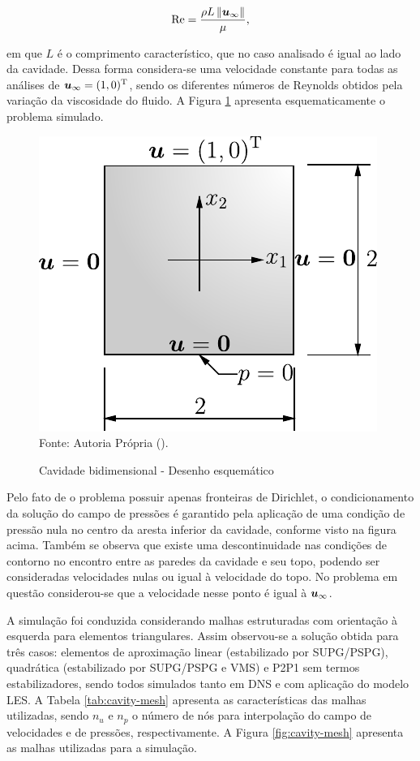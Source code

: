 \begin{equation}
    \mathrm{Re}=\frac{\rho L\left\lVert{\boldsymbol{u}_\infty}\right\lVert}{\mu}\text{,}
    \label{eq:Reynolds}
\end{equation}

\noindent em que $L$ é o comprimento característico, que no caso analisado é igual ao lado da cavidade. Dessa forma considera-se uma velocidade constante para todas as análises de $\boldsymbol{u}_\infty=(1,0)^\mathrm{T}$, sendo os diferentes números de Reynolds obtidos pela variação da viscosidade do fluido. A Figura \ref{fig:cavity} apresenta esquematicamente o problema simulado.

\begin{figure}[h!]
    \centering
    \caption{Cavidade bidimensional - Desenho esquemático}
    \includegraphics[width=.4\linewidth]{Figuras/Cavity/cavidade.pdf}
    \\Fonte: Autoria Própria (\the\year).
    \label{fig:cavity}
\end{figure}

Pelo fato de o problema possuir apenas fronteiras de Dirichlet, o condicionamento da solução do campo de pressões é garantido pela aplicação de uma condição de pressão nula no centro da aresta inferior da cavidade, conforme visto na figura acima. Também se observa que existe uma descontinuidade nas condições de contorno no encontro entre as paredes da cavidade e seu topo, podendo ser consideradas velocidades nulas ou igual à velocidade do topo. No problema em questão considerou-se que a velocidade nesse ponto é igual à $\boldsymbol{u}_\infty$.

A simulação foi conduzida considerando malhas estruturadas com orientação à esquerda para elementos triangulares. Assim observou-se a solução obtida para três casos: elementos de aproximação linear (estabilizado por SUPG/PSPG), quadrática (estabilizado por SUPG/PSPG e VMS) e P2P1 sem termos estabilizadores, sendo todos simulados tanto em DNS e com aplicação do modelo LES. A Tabela \ref{tab:cavity-mesh} apresenta as características das malhas utilizadas, sendo $n_u$ e $n_p$ o número de nós para interpolação do campo de velocidades e de pressões, respectivamente. A Figura \ref{fig:cavity-mesh} apresenta as malhas utilizadas para a simulação.

